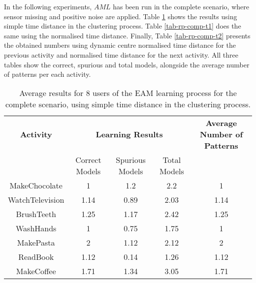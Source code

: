 In the following experiments, $AML$ has been run in the complete scenario, where sensor missing and positive noise are applied. Table \ref{tab-rp-comp-t0} shows the results using simple time distance in the clustering process. Table \ref{tab-rp-comp-t1} does the same using the normalised time distance. Finally, Table \ref{tab-rp-comp-t2} presents the obtained numbers using dynamic centre normalised time distance for the previous activity and normalised time distance for the next activity. All three tables show the correct, spurious and total models, alongside the average number of patterns per each activity.

\begin{table}[htbp]\scriptsize
  \begin{center}
        \begin{tabular}{ccccc}
            \hline            
            \textbf{Activity} & \multicolumn{3}{c}{\textbf{Learning Results}} & \textbf{Average Number of Patterns} \\
             & Correct Models & Spurious Models & Total Models & \\
            \hline
            MakeChocolate   & 1    & 1.2   & 2.2  & 1 \\
	    WatchTelevision & 1.14 & 0.89  & 2.03 & 1.14 \\
	    BrushTeeth      & 1.25 & 1.17  & 2.42 & 1.25 \\
	    WashHands       & 1    & 0.75  & 1.75 & 1 \\
	    MakePasta       & 2    & 1.12  & 2.12 & 2 \\
	    ReadBook        & 1.12 & 0.14  & 1.26 & 1.12 \\
	    MakeCoffee      & 1.71 & 1.34  & 3.05 & 1.71 \\
            \hline
        \end{tabular}                
        \caption{Average results for 8 users of the EAM learning process for the complete scenario, using simple time distance in the clustering process.}
        \label{tab-rp-comp-t0}
    \end{center}
\end{table}

